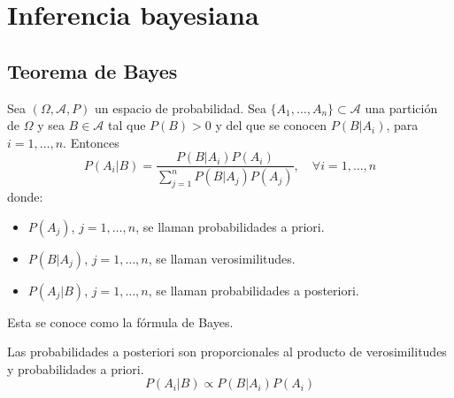 \chapter{Inferencia bayesiana}
\section{Teorema de Bayes}
\begin{theorem}
    Sea $(\Omega, \mathcal{A}, P)$ un espacio de probabilidad.
    Sea $\{A_1, \dots, A_n\} \subset \mathcal{A}$ una partición de $\Omega$ y sea $B \in \mathcal{A}$ tal que $P(B) > 0$ y del que se conocen $P(B|A_i)$, para $i = 1, \dots, n$.
    Entonces
    $$P(A_i|B) = \frac{P(B|A_i)P(A_i)}{\sum_{j=1}^n P(B|A_j)P(A_j)}, \quad \forall i = 1, \dots, n$$
    donde:
    \begin{itemize}
        \item $P(A_j)$, $j = 1, \dots, n$, se llaman probabilidades a priori.
        \item $P(B|A_j)$, $j = 1, \dots, n$, se llaman verosimilitudes.
        \item $P(A_j|B)$, $j= 1, \dots, n$, se llaman probabilidades a posteriori.
    \end{itemize}

    Esta se conoce como la fórmula de Bayes.
\end{theorem}

\begin{remark}
    Las probabilidades a posteriori son proporcionales al producto de verosimilitudes y probabilidades a priori.
    $$P(A_i|B) \propto P(B|A_i)P(A_i)$$
\end{remark}

